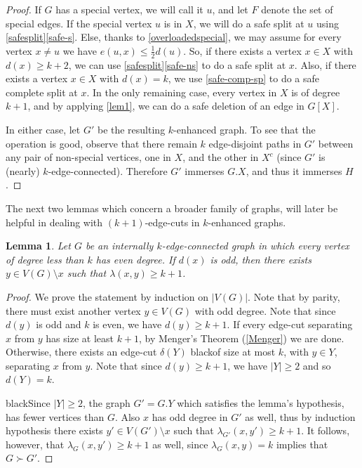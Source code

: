 \documentclass[letterpaper,11pt]{article}
\newtheorem{lemma}[theorem]{Lemma}
\theoremstyle{definition}
\newcommand{\col}{black}
\begin{document}
\begin{proof}
If $G$ has a special vertex, we will call it $u$, and let $F$ denote the set of special edges. If the special vertex $u$ is in $X$, we will do a safe split at $u$ using \cref{safesplit}\ref{safe-s}.  Else, thanks to \cref{overloadedspecial}, we may assume for every vertex $x \neq u$ we have $e(u,x) \le \frac{1}{2} d(u)$. So, if there exists a vertex $x \in X$ with $d(x)\ge k+2$, we can use \cref{safesplit}\ref{safe-ns} to do a safe split at $x$. Also, if there exists a vertex $x \in X$ with $d(x)=k$, we use \cref{safe-comp-sp} to do a safe complete split at $x$. In the only remaining case, every vertex in $X$ is of degree $k+1$, and by applying \cref{lem1}, we can do a safe deletion of an edge in $G[X]$.


In either case, let $G'$ be the resulting $k$-enhanced graph. To see that the operation is good, observe that there remain $k$ edge-disjoint paths in $G'$ between any pair of non-special vertices, one in $X$, and the other in $X^c$ (since $G'$ is (nearly) $k$-edge-connected). Therefore $G'$ immerses $G.X$, and thus it immerses $H$.
\end{proof}



The next two lemmas which concern a broader family of graphs, will later be helpful in dealing with $(k+1)$-edge-cuts in $k$-enhanced graphs.



\begin{lemma}
\label{lem3}
Let $G$ be an internally $k$-edge-connected graph in which every vertex of degree less than $k$ has even degree. If $d(x)$ is odd, then there exists $y \in V(G)\setminus x$ such that $\lambda (x, y)\geq k+1$.
\end{lemma}



\begin{proof}
We prove the statement by induction on $|V(G)|$. Note that by parity, there must exist another vertex $y \in V(G)$ with odd degree. Note that since $d(y)$ is odd and $k$ is even, we have $d(y)\ge k+1$. If every edge-cut separating $x$ from $y$ has size at least $k+1$, by Menger's Theorem (\cref{Menger}) we are done. Otherwise, there exists an edge-cut $\delta (Y)$ {\color \col of size at most $k$}, with $y \in Y$, separating $x$ from $y$. Note that since $d(y)\ge k+1$, we have $|Y|\geq 2$ and so $d(Y) = k$.

{\color \col Since} $|Y|\geq 2$, the graph ${G'}=G.Y$ which satisfies the lemma's hypothesis, has fewer vertices than $G$. Also $x$ has odd degree in $G'$ as well, thus by induction hypothesis there exists $y' \in V(G')\setminus x$ such that $\lambda _{G'}(x, y')\geq k+1$. It follows, however, that $\lambda _{G}(x, y')\geq k+1$ as well, since $\lambda_G(x,y)=k$ implies that $G \succ  {G'}$.
\end{proof}
\end{document}
